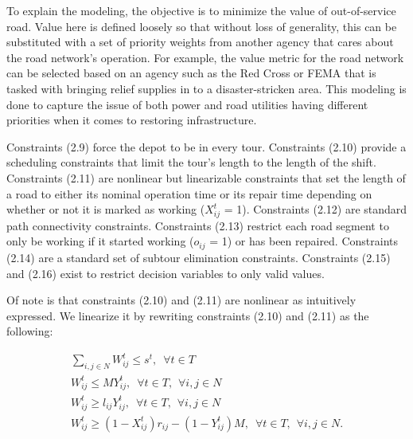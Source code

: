 To explain the modeling, the objective is to minimize the value of out-of-service road. Value here is defined loosely so that without loss of generality, this can be substituted with a set of priority weights from another agency that cares about the road network's operation. For example, the value metric for the road network can be selected based on an agency such as the Red Cross or FEMA that is tasked with bringing relief supplies in to a disaster-stricken area. This modeling is done to capture the issue of both power and road utilities having different priorities when it comes to restoring infrastructure.

Constraints (2.9) force the depot to be in every tour. Constraints (2.10) provide a scheduling constraints that limit the tour's length to the length of the shift. Constraints (2.11) are nonlinear but linearizable constraints that set the length of a road to either its nominal operation time or its repair time depending on whether or not it is marked as working ($X_{ij}^t$ = 1). Constraints (2.12) are standard path connectivity constraints. Constraints (2.13) restrict each road segment to only be working if it started working ($o_{ij}$ = 1) or has been repaired. Constraints (2.14) are a standard set of subtour elimination constraints. Constraints (2.15) and (2.16) exist to restrict decision variables to only valid values.

Of note is that constraints (2.10) and (2.11) are nonlinear as intuitively expressed. We linearize it by rewriting constraints (2.10) and (2.11) as the following:

\begin{eqnarray}
\sum_{i,j \in N} W_{ij}^t \leq s^t, \hspace{6pt} \forall t\in T \\
W_{ij}^t \leq MY_{ij}^t, \hspace{6pt} \forall t\in T, \hspace{5pt} \forall i,j \in N\\
W_{ij}^t \geq l_{ij}Y_{ij}^t, \hspace{6pt} \forall t\in T, \hspace{5pt} \forall i,j \in N\\
W_{ij}^t \geq (1-X_{ij}^t)r_{ij} - (1-Y_{ij}^t)M, \hspace{6pt} \forall t\in T, \hspace{5pt} \forall i,j \in N.
\end{eqnarray}


